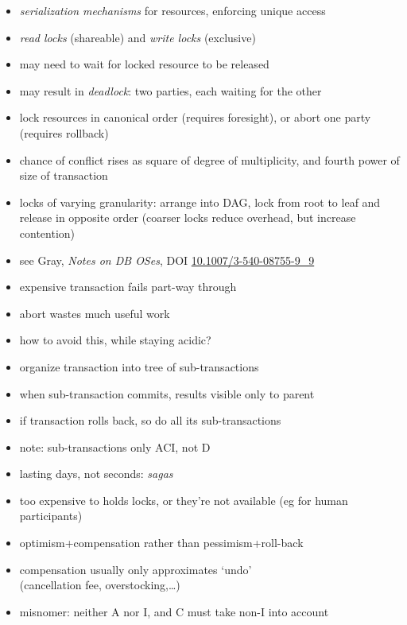 \documentclass{sepslide-soa-faked} %
\begin{document}
\begin{slide}
\begin{itemize}
\item \emph{serialization mechanisms} for resources, enforcing unique access
\item \emph{read locks} (shareable) and \emph{write locks} (exclusive)
\item may need to wait for locked resource to be released
\item may result in \emph{deadlock}: two parties, each waiting for the other %
\item lock resources in canonical order (requires foresight), or abort one party (requires rollback)
\item chance of conflict rises as square of degree of multiplicity, and fourth power of size of transaction
\item locks of varying granularity: arrange into DAG, lock from root to leaf and release in opposite order
  (coarser locks reduce overhead, but increase contention)
\item see Gray, \textit{Notes on DB OSes}, DOI \url{10.1007/3-540-08755-9_9}
\end{itemize}
\end{slide}

\begin{slide}
\begin{itemize}
\item expensive transaction fails part-way through
\item abort wastes much useful work
\item how to avoid this, while staying acidic?
\item organize transaction into tree of sub-transactions
\item when sub-transaction commits, results visible only to parent
\item if transaction rolls back, so do all its sub-transactions
\item note: sub-transactions only ACI, not D
\end{itemize}
\end{slide}

\begin{slide}
\begin{itemize}
\item lasting days, not seconds: \emph{sagas}
\item too expensive to holds locks,
   or they're not available (eg for human participants)
\item optimism+compensation rather than pessimism+roll-back
\item compensation usually only approximates `undo' \\
  (cancellation fee, overstocking,\ldots)
\item misnomer: neither A nor I, and C must take non-I into account
\end{itemize}
\end{slide}
\end{document}
